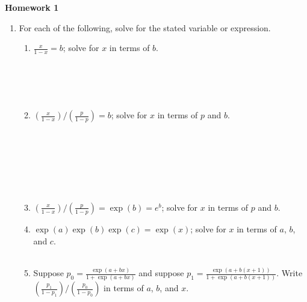 \documentclass{article}
\begin{document}
\begin{center}
    \large \textbf{Homework 1}
\end{center}
                \begin{enumerate}
                    \item For each of the following, solve for the stated variable or expression.
                        \begin{enumerate}
                            \item $ \frac{x}{1-x}=b$; solve for $x$ in terms of $b$.
			                \\[$\frac{x}{1-x}=b$]
			                \\[$x=b(1-x)$]
			                \\[$x=b-bx$]
			                \\[$x(1+b)=b$]
			                \\[$x=\frac{b}{1+b}$]
                            \item $ \left( \frac{x}{1-x}\right)\bigg/\left(\frac{p}{1-p}\right) = b$; solve for $x$ in terms of $p$ and $b$.
                            \\[$\frac{x}{1-x}=b\frac{p}{1-p}=\frac{bp}{1-p}$]\
                            \\[$x(1-p)=bp(1-x)$]
                            \\[$x-xp=bp(1-x)$]
                            \\[$x-xp=bp-bpx$]
                            \\[$bpx+x-xp=bp$]
                            \\[$x(bp+1-p)=bp$]
                            \\[$x=\frac{bp}{bp+1-p}$]
                            \item $ \left(\frac{x}{1-x}\right) \bigg/ \left(\frac{p}{1-p}\right) = \exp(b) = e^b$; solve for $x$ in terms of $p$ and $b$.
                            \\[$x=\frac{bp}{1+bp-p}$]
                            \item $ \exp(a)\exp(b)\exp(c)=\exp(x)$; solve for $x$ in terms of $a$, $b$, and $c$.
                            \\
                            \\[$x=a+b+c$]
                            \item Suppose $ p_0 = \frac{\exp(a+bx)}{1+\exp(a+bx)}$ and suppose $ p_1=\frac{\exp(a+b(x+1))}{1+\exp(a+b(x+1))}$.  Write $ \left(\frac{p_1}{1-p_1}\right) \bigg/ \left(\frac{p_0}{1-p_0}\right)$ in terms of $a$, $b$, and $x$.

\end{enumerate}
\end{enumerate}
\end{document}
